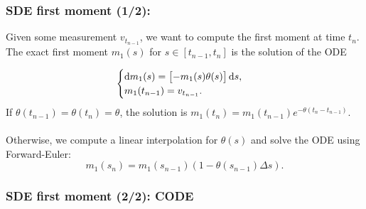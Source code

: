 \documentclass[aspectratio=169]{beamer}\usepackage[utf8]{inputenc}
\begin{document}
\begin{frame}\frametitle{SDE first moment (1/2):} \label{m1}
Given some measurement $v_{t_{n-1}}$, we want to compute the first moment at time $t_n$. The exact first moment $m_1(s)$ for $s\in[t_{n-1},t_n]$ is the solution of the ODE

\begin{equation*}
\begin{cases}
\dif m_1(s)=\left[-m_1(s)\theta(s)\right]\dif s,\\
m_1(t_{n-1})=v_{t_{n-1}}.
\end{cases}
\end{equation*}
If $\theta(t_{n-1})=\theta(t_{n})=\theta$, the solution is $m_1(t_n)=m_1(t_{n-1})e^{-\theta(t_n-t_{n-1})}$.\\
\quad\\
Otherwise, we compute a linear interpolation for $\theta(s)$ and solve the ODE using Forward-Euler:
\begin{equation*}
m_1(s_{n})=m_1(s_{n-1})(1-\theta(s_{n-1})\Delta s).
\end{equation*}

\end{frame}


\begin{frame}\frametitle{SDE first moment (2/2): CODE} \label{m1_code}

\begin{center}
\begin{tabular}{|c|}
\toprule
{\footnotesize

}\\
\bottomrule
\end{tabular}
\end{center}

\end{frame}
\end{document}
